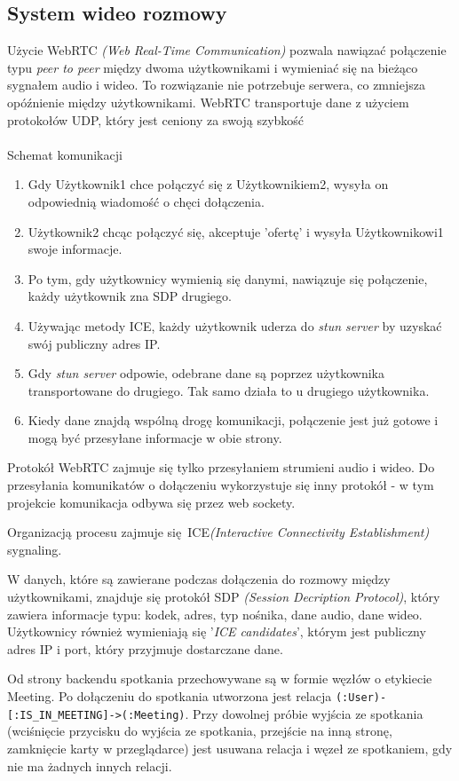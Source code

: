 \documentclass{article}
\begin{document}
\subsection{System wideo rozmowy}
Użycie WebRTC \textit{(Web Real-Time Communication)} pozwala nawiązać połączenie typu \textit{peer to peer} między dwoma użytkownikami i wymieniać się na bieżąco sygnałem audio i wideo. To rozwiązanie nie potrzebuje serwera, co zmniejsza opóźnienie między użytkownikami. WebRTC transportuje dane z użyciem protokołów UDP, który jest ceniony za swoją szybkość
\\\\
 Schemat komunikacji
 \begin{enumerate}
     \item Gdy Użytkownik1 chce połączyć się z Użytkownikiem2, wysyła on odpowiednią wiadomość o chęci dołączenia.
     \item  Użytkownik2 chcąc połączyć się, akceptuje 'ofertę' i wysyła Użytkownikowi1 swoje informacje.
     \item  Po tym, gdy użytkownicy wymienią się danymi, nawiązuje się połączenie, każdy użytkownik zna SDP drugiego.
     \item Używając metody ICE, każdy użytkownik uderza do \textit{stun server} by uzyskać swój publiczny adres IP.
     \item Gdy \textit{stun server} odpowie, odebrane dane są poprzez użytkownika transportowane do drugiego. Tak samo działa to u drugiego użytkownika.
     \item Kiedy dane znajdą wspólną drogę komunikacji, połączenie jest już gotowe i mogą być przesyłane informacje w obie strony.
 \end{enumerate}

Protokół WebRTC zajmuje się tylko przesyłaniem strumieni audio i wideo.
Do przesyłania komunikatów o dołączeniu wykorzystuje się inny protokół - w tym
projekcie komunikacja odbywa się przez web sockety.

Organizacją procesu zajmuje się ICE\textit{(Interactive Connectivity Establishment)} sygnaling.

 W danych, które są zawierane podczas dołączenia do rozmowy między użytkownikami, znajduje się protokół SDP \textit{(Session Decription Protocol)}, który zawiera informacje typu: kodek, adres, typ nośnika, dane audio, dane wideo. Użytkownicy również wymieniają się '\textit{ICE candidates}', którym jest publiczny adres IP i port, który przyjmuje dostarczane dane.

Od strony backendu spotkania przechowywane są w formie węzłów o etykiecie Meeting.
Po dołączeniu do spotkania utworzona jest relacja \verb|(:User)-[:IS_IN_MEETING]->(:Meeting)|.
Przy dowolnej próbie wyjścia ze spotkania (wciśnięcie przycisku do wyjścia ze spotkania,
przejście na inną stronę, zamknięcie karty w przeglądarce) jest usuwana relacja
i węzeł ze spotkaniem, gdy nie ma żadnych innych relacji.
\end{document}
